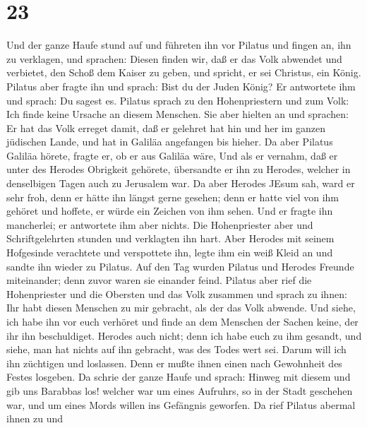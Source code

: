 \hypertarget{section-22}{%
\section{23}\label{section-22}}

 Und der ganze Haufe stund auf und führeten ihn vor Pilatus
 und fingen an, ihn zu verklagen, und sprachen: Diesen
finden wir, daß er das Volk abwendet und verbietet, den Schoß dem Kaiser
zu geben, und spricht, er sei Christus, ein König.  Pilatus
aber fragte ihn und sprach: Bist du der Juden König? Er antwortete ihm
und sprach: Du sagest es.  Pilatus sprach zu den
Hohenpriestern und zum Volk: Ich finde keine Ursache an diesem Menschen.
 Sie aber hielten an und sprachen: Er hat das Volk erreget
damit, daß er gelehret hat hin und her im ganzen jüdischen Lande, und
hat in Galiläa angefangen bis hieher.  Da aber Pilatus
Galiläa hörete, fragte er, ob er aus Galiläa wäre,  Und als
er vernahm, daß er unter des Herodes Obrigkeit gehörete, übersandte er
ihn zu Herodes, welcher in denselbigen Tagen auch zu Jerusalem war.
 Da aber Herodes JEsum sah, ward er sehr froh, denn er hätte
ihn längst gerne gesehen; denn er hatte viel von ihm gehöret und
hoffete, er würde ein Zeichen von ihm sehen.  Und er fragte
ihn mancherlei; er antwortete ihm aber nichts.  Die
Hohenpriester aber und Schriftgelehrten stunden und verklagten ihn hart.
 Aber Herodes mit seinem Hofgesinde verachtete und
verspottete ihn, legte ihm ein weiß Kleid an und sandte ihn wieder zu
Pilatus.  Auf den Tag wurden Pilatus und Herodes Freunde
miteinander; denn zuvor waren sie einander feind.  Pilatus
aber rief die Hohenpriester und die Obersten und das Volk zusammen
 und sprach zu ihnen: Ihr habt diesen Menschen zu mir
gebracht, als der das Volk abwende. Und siehe, ich habe ihn vor euch
verhöret und finde an dem Menschen der Sachen keine, der ihr ihn
beschuldiget.  Herodes auch nicht; denn ich habe euch zu
ihm gesandt, und siehe, man hat nichts auf ihn gebracht, was des Todes
wert sei.  Darum will ich ihn züchtigen und loslassen.
 Denn er mußte ihnen einen nach Gewohnheit des Festes
losgeben.  Da schrie der ganze Haufe und sprach: Hinweg mit
diesem und gib uns Barabbas los!  welcher war um eines
Aufruhrs, so in der Stadt geschehen war, und um eines Mords willen ins
Gefängnis geworfen.  Da rief Pilatus abermal ihnen zu und
